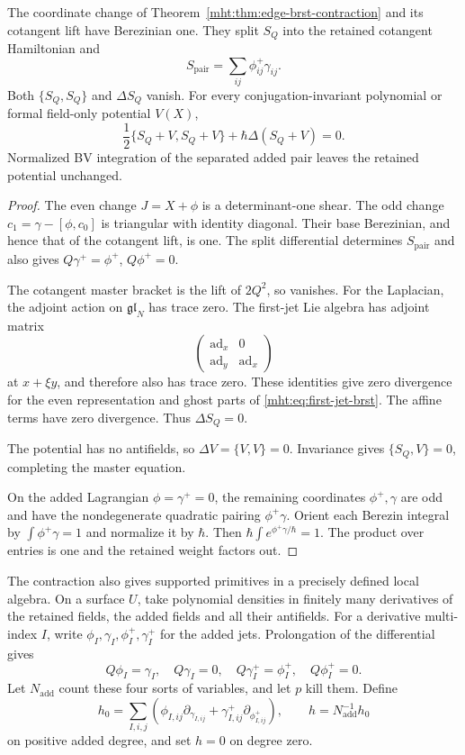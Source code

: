 \begin{theorem}\label{mht:thm:finite-edge-qme}
The coordinate change of Theorem~\ref{mht:thm:edge-brst-contraction}
and its cotangent lift have Berezinian one. They split $S_Q$ into
the retained cotangent Hamiltonian and
\[
 S_{\mathrm{pair}}=\sum_{ij}\phi_{ij}^+\gamma_{ij}.
\]
Both $\{S_Q,S_Q\}$ and $\Delta S_Q$ vanish. For every
conjugation-invariant polynomial or formal field-only potential
$V(X)$,
\begin{equation}\label{mht:eq:finite-edge-qme}
 \frac12\{S_Q+V,S_Q+V\}+\hbar\Delta(S_Q+V)=0.
\end{equation}
Normalized BV integration of the separated added pair leaves
the retained potential unchanged.
\end{theorem}

\begin{proof}
The even change $J=X+\phi$ is a determinant-one shear. The odd
change $c_1=\gamma-[\phi,c_0]$ is triangular with identity diagonal.
Their base Berezinian, and hence that of the cotangent lift, is one.
The split differential determines $S_{\mathrm{pair}}$ and also gives
$Q\gamma^+=\phi^+$, $Q\phi^+=0$.

The cotangent master bracket is the lift of $2Q^2$, so vanishes.
For the Laplacian, the adjoint action on $\mathfrak{gl}_N$ has
trace zero. The first-jet Lie algebra has adjoint matrix
\[
 \begin{pmatrix}\operatorname{ad}_x&0\\
                 \operatorname{ad}_y&\operatorname{ad}_x\end{pmatrix}
\]
at $x+\xi y$, and therefore also has trace zero. These identities
give zero divergence for the even representation and ghost parts
of \eqref{mht:eq:first-jet-brst}. The affine terms have zero
divergence. Thus $\Delta S_Q=0$.

The potential has no antifields, so $\Delta V=\{V,V\}=0$.
Invariance gives $\{S_Q,V\}=0$, completing the master equation.

On the added Lagrangian $\phi=\gamma^+=0$, the remaining
coordinates $\phi^+,\gamma$ are odd and have the nondegenerate
quadratic pairing $\phi^+\gamma$. Orient each Berezin integral by
$\int\phi^+\gamma=1$ and normalize it by $\hbar$. Then
$\hbar\int e^{\phi^+\gamma/\hbar}=1$.
The product over entries is one and the retained weight factors out.
\end{proof}

The contraction also gives supported primitives in a precisely
defined local algebra. On a surface $U$, take polynomial densities
in finitely many derivatives of the retained fields, the added
fields and all their antifields. For a derivative multi-index $I$,
write $\phi_I,\gamma_I,\phi_I^+,\gamma_I^+$ for the added jets.
Prolongation of the differential gives
\[
 Q\phi_I=\gamma_I,\quad Q\gamma_I=0,\quad
 Q\gamma_I^+=\phi_I^+,\quad Q\phi_I^+=0.
\]
Let $N_{\mathrm{add}}$ count these four sorts of variables, and let
$p$ kill them. Define
\[
 h_0=\sum_{I,i,j}
   \left(\phi_{I,ij}\partial_{\gamma_{I,ij}}
          +\gamma_{I,ij}^+\partial_{\phi_{I,ij}^+}\right),\qquad
 h=N_{\mathrm{add}}^{-1}h_0
\]
on positive added degree, and set $h=0$ on degree zero.

